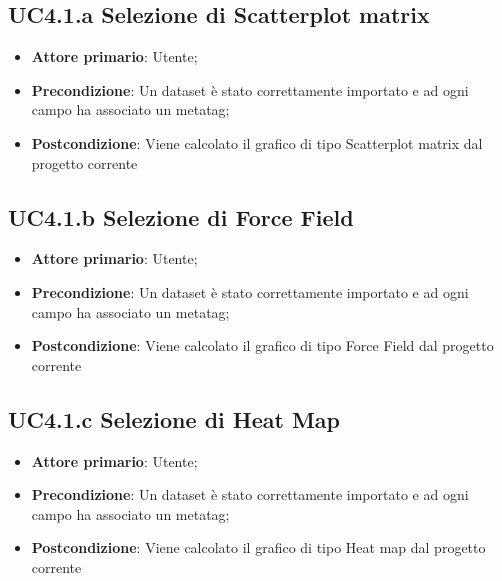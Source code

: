 \subsection{UC4.1.a Selezione di Scatterplot matrix}

\begin{itemize}

    \item \textbf{Attore primario}: Utente;

    \item \textbf{Precondizione}:   Un dataset è stato correttamente importato e ad ogni campo ha associato
                                    un metatag;

    \item \textbf{Postcondizione}:  Viene calcolato il grafico di tipo Scatterplot matrix dal progetto corrente
  
\end{itemize}


\subsection{UC4.1.b Selezione di Force Field}

\begin{itemize}

    \item \textbf{Attore primario}: Utente;

    \item \textbf{Precondizione}:   Un dataset è stato correttamente importato e ad ogni campo ha associato
                                    un metatag;

    \item \textbf{Postcondizione}:  Viene calcolato il grafico di tipo Force Field dal progetto corrente
  
\end{itemize}


\subsection{UC4.1.c Selezione di Heat Map}

\begin{itemize}

    \item \textbf{Attore primario}: Utente;

    \item \textbf{Precondizione}:   Un dataset è stato correttamente importato e ad ogni campo ha associato
                                    un metatag;

    \item \textbf{Postcondizione}:  Viene calcolato il grafico di tipo Heat map dal progetto corrente
  
\end{itemize}


